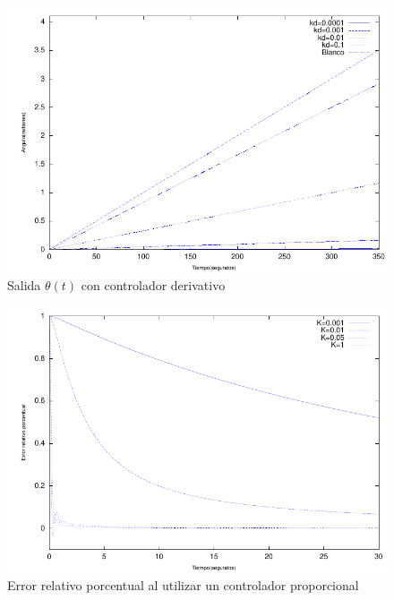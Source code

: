 \documentclass{sig-alternate}
\begin{document}
\begin{figure}[hp]
\label{mDerivativo}
\centering
\includegraphics[scale=0.8]{graficos/mDerivativo}
\caption{Salida $\theta(t)$ con controlador derivativo}
\end{figure}

\begin{figure}[hp]
\label{errorPorcentualMProporcional}
\centering
\includegraphics[scale=0.8]{graficos/errorMProporcional}
\caption{Error relativo porcentual al utilizar un controlador proporcional}
\end{figure}
\end{document}
